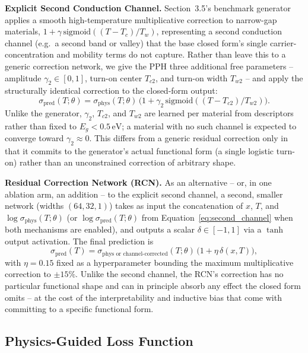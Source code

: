 \documentclass[11pt]{article}
\begin{document}
\textbf{Explicit Second Conduction Channel.} Section~3.5's benchmark generator applies a smooth high-temperature multiplicative correction to narrow-gap materials, $1 + \gamma\,\text{sigmoid}((T-T_c)/T_w)$, representing a second conduction channel (e.g.\ a second band or valley) that the base closed form's single carrier-concentration and mobility terms do not capture. Rather than leave this to a generic correction network, we give the PPH three additional free parameters -- amplitude $\gamma_2 \in [0,1]$, turn-on center $T_{c2}$, and turn-on width $T_{w2}$ -- and apply the structurally identical correction to the closed-form output:
\begin{equation}
\sigma_{\text{pred}}(T;\theta) = \sigma_{\text{phys}}(T;\theta)\,\big(1 + \gamma_2\,\text{sigmoid}((T-T_{c2})/T_{w2})\big).
\label{eq:second_channel}
\end{equation}
Unlike the generator, $\gamma_2$, $T_{c2}$, and $T_{w2}$ are learned per material from descriptors rather than fixed to $E_g < 0.5\,\text{eV}$; a material with no such channel is expected to converge toward $\gamma_2 \approx 0$. This differs from a generic residual correction only in that it commits to the generator's actual functional form (a single logistic turn-on) rather than an unconstrained correction of arbitrary shape.

\textbf{Residual Correction Network (RCN).} As an alternative -- or, in one ablation arm, an addition -- to the explicit second channel, a second, smaller network (widths $(64,32,1)$) takes as input the concatenation of $x$, $T$, and $\log \sigma_{\text{phys}}(T;\theta)$ (or $\log \sigma_{\text{pred}}(T;\theta)$ from Equation~\ref{eq:second_channel} when both mechanisms are enabled), and outputs a scalar $\delta \in [-1,1]$ via a $\tanh$ output activation. The final prediction is
\begin{equation}
\sigma_{\text{pred}}(T) = \sigma_{\text{phys or channel-corrected}}(T;\theta)\, \big(1 + \eta\, \delta(x,T)\big),
\label{eq:final}
\end{equation}
with $\eta = 0.15$ fixed as a hyperparameter bounding the maximum multiplicative correction to $\pm 15\%$. Unlike the second channel, the RCN's correction has no particular functional shape and can in principle absorb any effect the closed form omits -- at the cost of the interpretability and inductive bias that come with committing to a specific functional form.

\subsection{Physics-Guided Loss Function}
\end{document}
